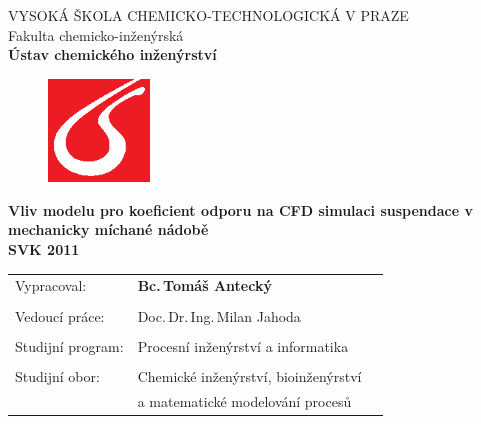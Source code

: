 \begin{center}
{\Large VYSOKÁ ŠKOLA CHEMICKO-TECHNOLOGICKÁ V PRAZE\\}
{\large Fakulta chemicko-inženýrská\\
\textbf{Ústav chemického inženýrství}\\}
\vspace{15mm}

\begin{figure}[!h]
\begin{center}
\includegraphics[angle=0,width=27mm]{images/logo_vscht.eps}
\end{center}
\end{figure}

\vspace{25mm}

{\LARGE \textbf{Vliv modelu pro koeficient odporu na CFD simulaci suspendace v mechanicky míchané nádobě\\}}
\vspace{10mm}
{\Large \textbf{SVK 2011\\}}
\end{center}
\vspace{35mm}

\null
\vfill

\begin{tabular}{p{50mm}lp{50mm}}
Vypracoval: & \textbf{Bc.\,Tomáš Antecký}\\
\\
Vedoucí práce: & Doc.\,Dr.\,Ing.\,Milan Jahoda \\

\\
Studijní program: & Procesní inženýrství a informatika \\
\\
Studijní obor: & Chemické inženýrství, bioinženýrství \\
	& a matematické modelování procesů\\
\end{tabular}
